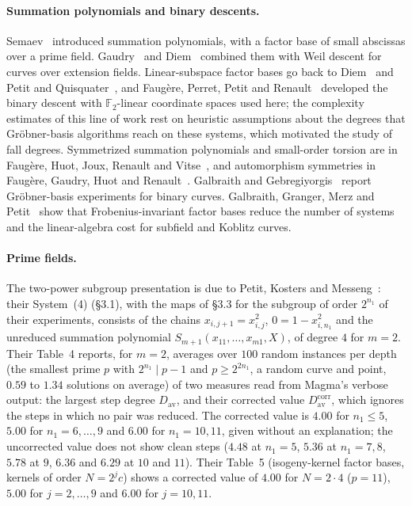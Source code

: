\documentclass[11pt]{article}
\theoremstyle{definition}\newtheorem{definition}[theorem]{Definition}
\theoremstyle{remark}\newtheorem{remark}[theorem]{Remark}
\newcommand{\F}{\mathbb F}
\begin{document}
\paragraph{Summation polynomials and binary descents.} Semaev~\cite{semaev}
introduced summation polynomials, with a factor base of small abscissas over
a prime field. Gaudry~\cite{gaudry09} and Diem~\cite{diem11} combined them
with Weil descent for curves over extension fields. Linear-subspace factor
bases go back to Diem~\cite{diem11} and Petit and Quisquater~\cite{pq12},
and Faug\`ere, Perret, Petit and Renault~\cite{fppr} developed the binary
descent with $\F_2$-linear coordinate spaces used here; the complexity
estimates of this line of work rest on heuristic assumptions about the
degrees that Gr\"obner-basis algorithms reach on these systems, which
motivated the study of fall degrees. Symmetrized summation polynomials and
small-order torsion are in Faug\`ere, Huot, Joux, Renault and
Vitse~\cite{fhjrv}, and automorphism symmetries in Faug\`ere, Gaudry, Huot
and Renault~\cite{fghr14}. Galbraith and Gebregiyorgis~\cite{gg} report
Gr\"obner-basis experiments for binary curves. Galbraith, Granger, Merz and
Petit~\cite{ggmp21} show that Frobenius-invariant factor bases reduce the
number of systems and the linear-algebra cost for subfield and Koblitz
curves.

\paragraph{Prime fields.} The two-power subgroup presentation is due to
Petit, Kosters and Messeng~\cite[\S\S3.1, 3.3]{pkm}: their System~(4)
(\S3.1), with the maps of \S3.3 for the subgroup of order $2^{n_1}$ of
their experiments, consists of the chains $x_{i,j+1}=x_{i,j}^2$, $0=1-x_{i,n_1}^2$ and the unreduced
summation polynomial $S_{m+1}(x_{11},\ldots,x_{m1},X)$, of degree $4$ for
$m=2$. Their Table~4 reports, for $m=2$, averages over $100$ random
instances per depth (the smallest prime $p$ with $2^{n_1}\mid p-1$ and
$p\ge2^{2n_1}$, a random curve and point, $0.59$ to $1.34$ solutions on
average) of two measures read from Magma's verbose output: the largest step
degree $D_{\mathrm{av}}$, and their corrected value
$D^{\mathrm{corr}}_{\mathrm{av}}$, which ignores the steps in which no pair
was reduced. The corrected value is $4.00$ for $n_1\le5$, $5.00$ for
$n_1=6,\ldots,9$ and $6.00$ for $n_1=10,11$, given without an explanation;
the uncorrected value does not show clean steps ($4.48$ at $n_1=5$, $5.36$
at $n_1=7,8$, $5.78$ at $9$, $6.36$ and $6.29$ at $10$ and $11$). Their
Table~5 (isogeny-kernel factor bases, kernels of order $N=2^jc$) shows a
corrected value of $4.00$ for $N=2\cdot4$ ($p=11$), $5.00$ for
$j=2,\ldots,9$ and $6.00$ for $j=10,11$.
\end{document}
